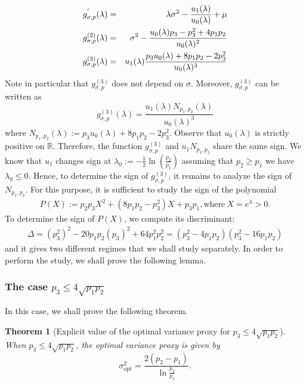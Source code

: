 \documentclass[a4paper, 10pt]{article}
\newcommand{\beq}{\begin{equation}}
\newcommand{\eeq}{\end{equation}}
\newcommand{\bea}{\begin{eqnarray}}
\newcommand{\eea}{\end{eqnarray}}
\newtheorem{theorem}{Theorem}[section]
\theoremstyle{definition}
\begin{document}
\bea g^{'}_{\sigma,p}(\lambda)&=&\lambda \sigma^2 -\frac{u_1(\lambda)}{u_0(\lambda)} + \mu \cr 
g^{(2)}_{\sigma,p}(\lambda)&=& \sigma^2-\frac{u_0(\lambda)p_3-p_3^2+4p_1p_2}{u_0(\lambda)^2}\cr
g^{(3)}_{\sigma, p}(\lambda)&=& u_1(\lambda)\frac{p_3u_0(\lambda)+8p_1p_2-2p_3^2}{u_0(\lambda)^3}
\eea
Note in particular that $g^{(3)}_{\sigma, p}$ does not depend on $\sigma$. Moreover, $g^{(3)}_{\sigma, p}$ can be written as
\beq\label{g3} g^{(3)}_{\sigma, p}(\lambda) = \frac{u_1(\lambda)N_{p_1,p_2}(\lambda)}{u_0(\lambda)^3} \eeq
where $N_{p_1,p_2}(\lambda) := p_3u_0(\lambda)+8p_1p_2-2p_3^2$. Observe that $u_0(\lambda)$ is strictly positive on $\mathbb{R}$. Therefore, the function $g_{\sigma, p}^{(3)}$ and $u_1 N_{p_1, p_2} $ share the same sign. We know that $u_1$ changes sign at $\lambda_0 := -\frac{1}{2}\ln(\frac{p_2}{p_1})$ assuming that $p_2\geq p_1$ we have $\lambda_0 \leq 0$. Hence, to determine the sign of $g^{(3)}_{\sigma, p}$, it remains to analyze the sign of $N_{p_1, p_2}$. For this purpose, it is sufficient to  study the sign of the polynomial
\bea P(X) :=p_2p_3X^2+(8p_1p_2-p_3^2)X+p_3p_1, \text{where}\  X = e^{\lambda} > 0.\eea 
To determine the sign of $P(X)$, we compute its discriminant:
\bea \Delta = (p_3^2)^2 - 20p_1p_2(p_3)^2 + 64p_1^2p_2^2= (p_3^2-4p_1p_2)(p_3^2-16p_1p_2) \eea 
and it gives two different regimes that we shall study separately. In order to perform the study, we shall prove the following lemma.


\subsubsection{The case $p_3\leq 4\sqrt{p_1p_2}$}
In this case, we shall prove the following theorem.
\begin{theorem}[Explicit value of the optimal variance proxy for $p_3\leq 4\sqrt{p_1p_2}$]\label{TheoRegime1} When $p_3\leq 4\sqrt{p_1p_2}$, the optimal variance proxy is given by
\beq \sigma_{\mathrm{opt}}^2= \frac{2(p_2-p_1)}{\ln \frac{p_2}{p_1}}.\eeq
\end{theorem}
\end{document}
